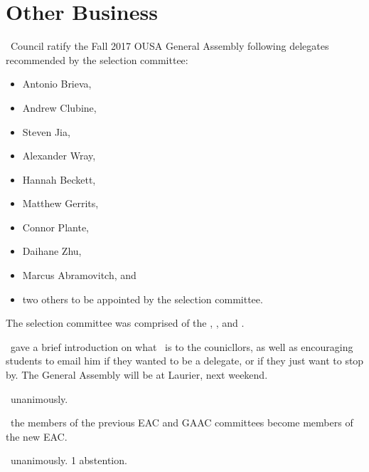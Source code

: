 \section*{Other Business}


\begin{motion}
    \birt\ Council ratify the Fall 2017 OUSA General Assembly following
    delegates recommended by the selection committee:
    \begin{itemize}
        \item Antonio Brieva,
        \item Andrew Clubine,
        \item Steven Jia,
        \item Alexander Wray,
        \item Hannah Beckett,
        \item Matthew Gerrits,
        \item Connor Plante,
        \item Daihane Zhu,
        \item Marcus Abramovitch, and
        \item two others to be appointed by the selection committee.
    \end{itemize}
    The selection committee was comprised of the \vpe, \pres, and 
    \printSpeaker.
    \movers{\andrewc}{\benjamin}

    \andrewc\ gave a brief introduction on what \ousa\ is to the counicllors,
    as well as encouraging students to email him if they wanted to be a 
    delegate, or if they just want to stop by. The General Assembly will be at 
    Laurier, next weekend.

    \carries\ unanimously.
\end{motion}

\begin{motion}
    \birt\ the members of the previous EAC and GAAC committees become members
    of the new EAC.
    \movers{\jason}{\andrewc}

    \carries\ unanimously. 1 abstention.
\end{motion}

